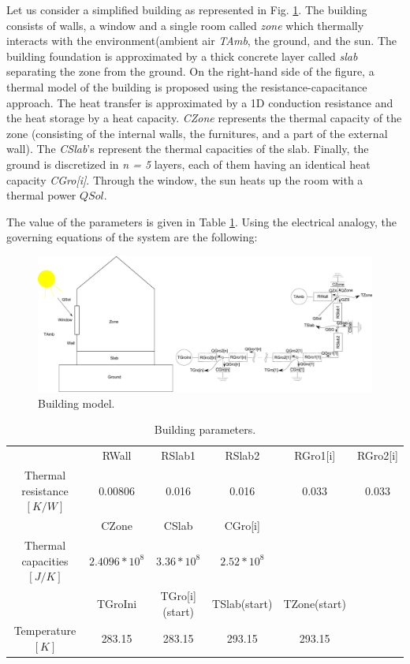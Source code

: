 \documentclass[10pt,a4paper]{article}
\begin{document}
Let us consider a simplified building as represented in Fig. \ref{fig:bui}. The building consists of  walls, a window and a single room called \textit{zone} which thermally interacts with the environment(ambient air \textit{TAmb}, the ground, and the sun. The building foundation is approximated by a thick concrete layer called \textit{slab} separating the zone from the ground. On the right-hand side of the figure, a thermal model of the building is proposed using the resistance-capacitance approach. The heat transfer is approximated by a 1D conduction resistance and the heat storage by a heat capacity. \textit{CZone} represents the thermal capacity of the zone (consisting of the internal walls, the furnitures, and a part of the external wall). The \textit{CSlab}'s represent the thermal capacities of the slab. Finally, the ground is discretized in \textit{n = 5} layers, each of them having an identical heat capacity \textit{CGro[i]}. Through the window, the sun heats up the room with a thermal power $QSol$. 

The value of the parameters is given in Table \ref{tab:par}. Using the electrical analogy, the governing equations of the system are the following:

\begin{figure}[hbtp] 
	\centering
	\includegraphics[width=1 \textwidth]{images/RCModelHouse.pdf}
	\caption{ Building model.}
	\label{fig:bui}
\end{figure}

\begin{table}[hbtp] 
\begin{tabular}{cccccc}
\hline 
  & RWall & RSlab1 & RSlab2 & RGro1[i] & RGro2[i] \\  
Thermal resistance $[K/W]$ & 0.00806 & 0.016 & 0.016 & 0.033 & 0.033 \\ 
\hline\hline 
  & CZone & CSlab & CGro[i] &   &   \\  
Thermal capacities $[J/K]$ & $2.4096 * 10^8$ & $3.36 * 10^8$ & $2.52*10^8$ &   &   \\ 
\hline\hline
  & TGroIni & TGro[i](start) & TSlab(start) & TZone(start)&  \\  
Temperature $[K]$ &  283.15 & 283.15 & 293.15 & 293.15 & \\ 
\hline 
\end{tabular} 
\caption{ Building parameters.}
\label{tab:par}
\end{table}
\end{document}
